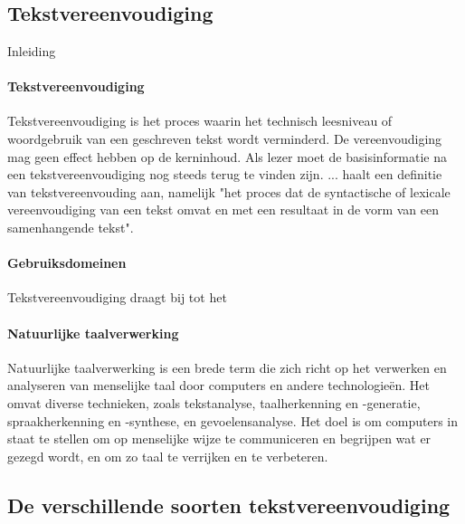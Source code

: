 \chapter{}%
\label{ch:stand-van-zaken}

\section{Tekstvereenvoudiging}

Inleiding

\subsubsection{Tekstvereenvoudiging}

Tekstvereenvoudiging is het proces waarin het technisch leesniveau of woordgebruik van een geschreven tekst wordt verminderd. De vereenvoudiging mag geen effect hebben op de kerninhoud. Als lezer moet de basisinformatie na een tekstvereenvoudiging nog steeds terug te vinden zijn. ... haalt een definitie van tekstvereenvouding aan, namelijk "het proces dat de syntactische of lexicale vereenvoudiging van een tekst omvat en met een resultaat in de vorm van een samenhangende tekst". 


\subsubsection{Gebruiksdomeinen}

Tekstvereenvoudiging draagt bij tot het 

\subsubsection{Natuurlijke taalverwerking}

Natuurlijke taalverwerking is een brede term die zich richt op het verwerken en analyseren van menselijke taal door computers en andere technologieën. Het omvat diverse technieken, zoals tekstanalyse, taalherkenning en -generatie, spraakherkenning en -synthese, en gevoelensanalyse. Het doel is om computers in staat te stellen om op menselijke wijze te communiceren en begrijpen wat er gezegd wordt, en om zo taal te verrijken en te verbeteren.

\section{De verschillende soorten tekstvereenvoudiging}

